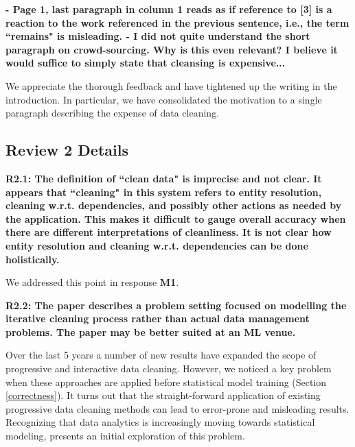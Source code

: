 \vspace{0.5em}

\noindent\textbf{- Page 1, last paragraph in column 1 reads as if reference to [3] is a reaction to the work referenced in the previous sentence, i.e., the term ``remains" is misleading.
- I did not quite understand the short paragraph on crowd-sourcing. Why is this even relevant?
 I believe it would suffice to simply state that cleansing is expensive...}

We appreciate the thorough feedback and have tightened up the writing in the introduction. In particular, we have consolidated the motivation to a single paragraph describing the expense of data cleaning.


\subsection*{Review 2 Details}

\noindent\textbf{R2.1: The definition of ``clean data" is imprecise and not clear. It appears that ``cleaning" in this system refers to entity resolution, cleaning w.r.t. dependencies, and possibly other actions as needed by the application. This makes it difficult to gauge overall accuracy when there are different interpretations of cleanliness. It is not clear how entity resolution and cleaning w.r.t. dependencies can be done holistically.}

We addressed this point in response \textbf{M1}.

\vspace{0.5em}

\noindent\textbf{R2.2: The paper describes a problem setting focused on modelling the iterative cleaning process rather than actual data management problems. The paper may be better suited at an ML venue.}

Over the last 5 years a number of new results have expanded the scope of progressive and interactive data cleaning\cite{mayfield2010eracer, DBLP:journals/pvldb/YakoutENOI11, yakout2013don, altowim2014progressive, whang2014incremental, papenbrock2015progressive, gruenheid2014incremental}.
However, we noticed a key problem when these approaches are applied before statistical model training (Section \ref{correctness}).
It turns out that the straight-forward application of existing progressive data cleaning methods
can lead to error-prone and misleading results.
Recognizing that data analytics is increasingly moving towards statistical modeling, \sys presents an initial exploration of this problem.  

